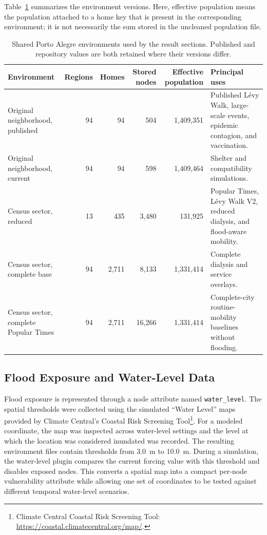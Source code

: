 Table~\ref{tbl:shared_simulation_environments} summarizes the environment versions. Here, effective population means the population attached to a home key that is present in the corresponding environment; it is not necessarily the sum stored in the uncleaned population file.

\begin{table}[ht]
\centering
\footnotesize
\setlength{\tabcolsep}{4pt}
\caption{Shared Porto Alegre environments used by the result sections. Published and repository values are both retained where their versions differ.}
\label{tbl:shared_simulation_environments}
\begin{tabularx}{\linewidth}{@{}p{2.6cm}rrrrX@{}}
\toprule
\textbf{Environment} &
\textbf{Regions} &
\textbf{Homes} &
\textbf{Stored nodes} &
\textbf{Effective population} &
\textbf{Principal uses} \\
\midrule
Original neighborhood, published
    & 94 & 94 & 504 & 1,409,351
    & Published L\'evy Walk, large-scale events, epidemic contagion, and vaccination. \\
Original neighborhood, current
    & 94 & 94 & 598 & 1,409,464
    & Shelter and compatibility simulations. \\
Census sector, reduced
    & 13 & 435 & 3,480
    & 131,925
    & Popular Times, L\'evy Walk V2, reduced dialysis, and flood-aware mobility. \\
Census sector, complete base
    & 94 & 2,711 & 8,133
    & 1,331,414
    & Complete dialysis and service overlays. \\
Census sector, complete Popular Times
    & 94 & 2,711 & 16,266
    & 1,331,414
    & Complete-city routine-mobility baselines without flooding. \\
\bottomrule
\end{tabularx}
\end{table}

\subsection{Flood Exposure and Water-Level Data}
\label{sec:flood_water_input_data}

Flood exposure is represented through a node attribute named \texttt{water\_level}. The spatial thresholds were collected using the simulated ``Water Level'' maps provided by Climate Central's Coastal Risk Screening Tool\footnote{Climate Central Coastal Risk Screening Tool: \url{https://coastal.climatecentral.org/map/}.}. For a modeled coordinate, the map was inspected across water-level settings and the level at which the location was considered inundated was recorded. The resulting environment files contain thresholds from 3.0~m to 10.0~m. During a simulation, the water-level plugin compares the current forcing value with this threshold and disables exposed nodes. This converts a spatial map into a compact per-node vulnerability attribute while allowing one set of coordinates to be tested against different temporal water-level scenarios.

